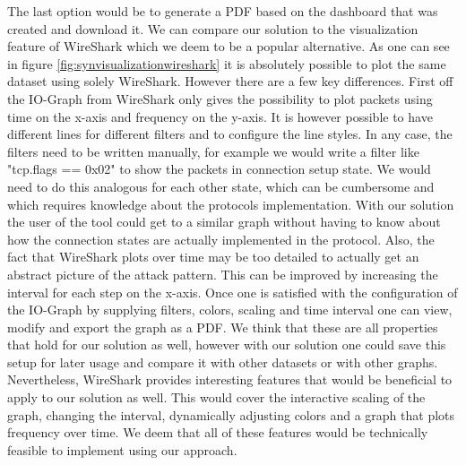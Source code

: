 The last option would be to generate a PDF based on the dashboard that was created and download it.
We can compare our solution to the visualization feature of WireShark which we deem to be a popular alternative.
As one can see in figure \ref{fig:synvisualizationwireshark} it is absolutely possible to plot the same dataset using solely WireShark. However there are a few key differences. First off the IO-Graph from WireShark only gives the possibility to plot packets using time on the x-axis and frequency on the y-axis. It is however possible to have different lines for different filters and to configure the line styles. In any case, the filters need to be written manually, for example we would write a filter like "tcp.flags == 0x02" to show the packets in connection setup state. We would need to do this analogous for each other state, which can be cumbersome and which requires knowledge about the protocols implementation. With our solution the user of the tool could get to a similar graph without having to know about how the connection states are actually implemented in the protocol. Also, the fact that WireShark plots over time may be too detailed to actually get an abstract picture of the attack pattern. This can be improved by increasing the interval for each step on the x-axis.
Once one is satisfied with the configuration of the IO-Graph by supplying filters, colors, scaling and time interval one can view, modify and export the graph as a PDF. We think that these are all properties that hold for our solution as well, however with our solution one could save this setup for later usage and compare it with other datasets or with other graphs. Nevertheless, WireShark provides interesting features that would be beneficial to apply to our solution as well. This would cover the interactive scaling of the graph, changing the interval, dynamically adjusting colors and a graph that plots frequency over time. We deem that all of these features would be technically feasible to implement using our approach.

